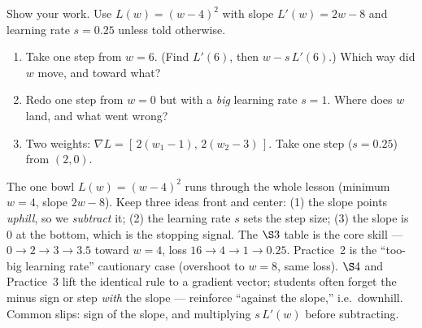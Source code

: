\documentclass[10pt]{article}
\begin{document}
\begin{practicebox}
Show your work. Use $L(w)=(w-4)^2$ with slope $L'(w)=2w-8$ and learning rate $s=0.25$ unless told otherwise.
\begin{enumerate}[leftmargin=1.6em, itemsep=4pt]
  \item Take one step from $w=6$. (Find $L'(6)$, then $w-s\,L'(6)$.) Which way did $w$ move, and toward what? 
  \item Redo one step from $w=0$ but with a \emph{big} learning rate $s=1$. Where does $w$ land, and what went wrong? 
  \item Two weights: $\nabla L=[\,2(w_1-1),\,2(w_2-3)\,]$. Take one step ($s=0.25$) from $(2,0)$. 
\end{enumerate}
\end{practicebox}

\begin{teachernote}
The one bowl $L(w)=(w-4)^2$ runs through the whole lesson (minimum $w=4$, slope $2w-8$). Keep three ideas
front and center: (1) the slope points \emph{uphill}, so we \emph{subtract} it; (2) the learning rate $s$ sets
the step size; (3) the slope is $0$ at the bottom, which is the stopping signal. The $\S3$ table is the core
skill --- $0\to2\to3\to3.5$ toward $w=4$, loss $16\to4\to1\to0.25$. Practice~2 is the ``too-big learning rate''
cautionary case (overshoot to $w=8$, same loss). $\S4$ and Practice~3 lift the identical rule to a gradient
vector; students often forget the minus sign or step \emph{with} the slope --- reinforce ``against the slope,''
i.e.\ downhill. Common slips: sign of the slope, and multiplying $s\,L'(w)$ before subtracting.
\end{teachernote}
\end{document}
